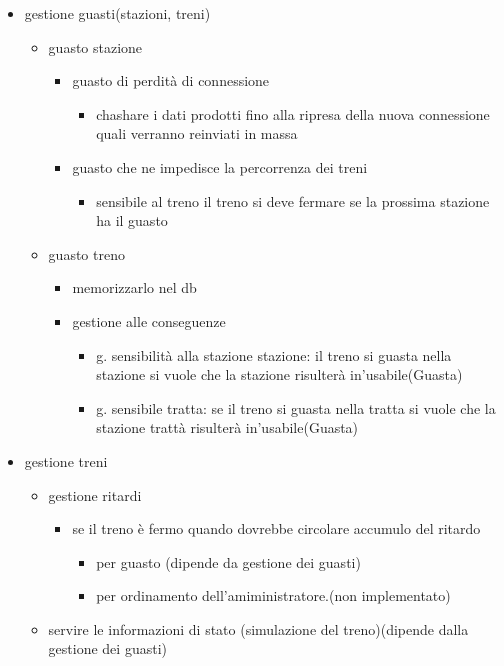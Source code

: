 \documentclass[11pt]{article}
\begin{document}
\begin{itemize}
\item gestione guasti(stazioni, treni)
\begin{itemize}
\item guasto stazione
\begin{itemize}
\item guasto di perdità di connessione
\begin{itemize}
\item chashare i dati prodotti fino alla ripresa della nuova connessione quali verranno reinviati in massa
\end{itemize}
\item guasto che ne impedisce la percorrenza dei treni
\begin{itemize}
\item sensibile al treno il treno si deve fermare se la prossima stazione ha il guasto
\end{itemize}
\end{itemize}
\item guasto treno
\begin{itemize}
\item memorizzarlo nel db
\item gestione alle conseguenze
\begin{itemize}
\item g. sensibilità alla stazione stazione: il treno si guasta nella stazione si vuole che la stazione risulterà in'usabile(Guasta)
\item g. sensibile tratta: se il treno si guasta nella tratta si vuole che la stazione trattà risulterà in'usabile(Guasta)
\end{itemize}
\end{itemize}
\end{itemize}
\item gestione treni
\begin{itemize}
\item gestione ritardi
\begin{itemize}
\item se il treno è fermo quando dovrebbe circolare accumulo del ritardo
\begin{itemize}
\item per guasto (dipende da gestione dei guasti)
\item per ordinamento dell'amiministratore.(non implementato)
\end{itemize}
\end{itemize}
\item servire le informazioni di stato (simulazione del treno)(dipende dalla gestione dei guasti)

\end{itemize}
\end{itemize}
\end{document}
